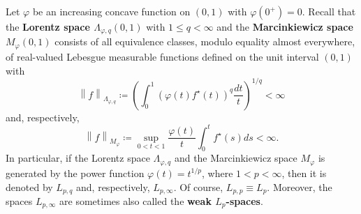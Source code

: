 \documentclass[11pt]{amsart}
\theoremstyle{definition}
\theoremstyle{definition}
\theoremstyle{definition}
\theoremstyle{definition}
\theoremstyle{definition}
\theoremstyle{definition}
\theoremstyle{definition}
\theoremstyle{definition}
\numberwithin{equation}{section}
\numberwithin{equation}{section}
\numberwithin{equation}{section}
\theoremstyle{definition}
\theoremstyle{definition}
\theoremstyle{definition}
\theoremstyle{definition}
\theoremstyle{definition}
\theoremstyle{definition}
\newcommand{\norm}[1]{\left\lVert#1\right\rVert}
\begin{document}
Let $\varphi$ be an increasing concave function on $(0,1)$ with $\varphi(0^+) = 0$. Recall that the {\bf Lorentz space
$\Lambda_{{\varphi},q}(0,1)$} with $1 \leqslant q < \infty$ and the {\bf Marcinkiewicz space $M_{\varphi}(0,1)$} consists
of all equivalence classes, modulo equality almost everywhere, of real-valued Lebesgue measurable functions defined on
the unit interval $(0,1)$ with
\begin{equation} \label{EQ: Lorentz function}
	\norm{f}_{\Lambda_{{\varphi},q}} \coloneqq \left( \int_0^1 \left( \varphi(t)f^{\star}(t) \right)^q \frac{dt}{t} \right)^{1/q} < \infty
\end{equation}
and, respectively,
\begin{equation} \label{EQ: Marcinkiewicz function}
	\norm{f}_{M_{\varphi}} \coloneqq \sup\limits_{0 < t < 1} \frac{\varphi(t)}{t} \int_0^t f^{\star}(s)ds  < \infty.
\end{equation}
In particular, if the Lorentz space  $\Lambda_{{\varphi},q}$ and the Marcinkiewicz space $M_{\varphi}$ is generated by
the power function $\varphi(t) = t^{1/p}$, where $1 < p < \infty$, then it is denoted by $L_{p,q}$ and, respectively, $L_{p,\infty}$.
Of course, $L_{p,p} \equiv L_p$. Moreover, the spaces $L_{p,\infty}$ are sometimes also called the {\bf weak $L_p$-spaces}.
\end{document}
